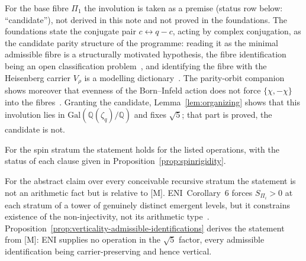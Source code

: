 \documentclass[11pt]{article}
\theoremstyle{definition}
\theoremstyle{remark}
\newcommand{\Gal}{\mathrm{Gal}}
\begin{document}
        For the base fibre $\Pi_1$ the involution is taken as a premise (status row below: ``candidate''), not derived in
    this note and not proved in the foundations.
    The foundations state the conjugate pair $c\leftrightarrow q-c$, acting by complex conjugation, as the candidate
    parity structure of the programme: reading it as the minimal admissible fibre is a structurally motivated
    hypothesis, the fibre identification being an open classification problem~\cite{Beau2026m}, and identifying the
    fibre with the Heisenberg carrier $V_\rho$ is a modelling dictionary~\cite{Beau2026m,Beau2026HeisenbergStructure}.
    The parity-orbit companion shows moreover that evenness of the Born--Infeld action does not force
    $\{\chi,-\chi\}$ into the fibres~\cite{Beau2026a22}.
    Granting the candidate, Lemma~\ref{lem:organizing} shows that this involution lies in
    $\Gal(\mathbb{Q}(\zeta_q)/\mathbb{Q})$ and fixes $\sqrt{5}$; that part is proved, the candidate is not.

    For the spin stratum the statement holds for the listed operations, with the status of each clause given in
    Proposition~\ref{prop:spinrigidity}.

    For the abstract claim over every conceivable recursive stratum the statement is not an arithmetic fact but is
    relative to [M].
    ENI~Corollary~6 forces $S_{\Pi_i}>0$ at each stratum of a tower of genuinely distinct emergent levels, but it
    constrains existence of the non-injectivity, not its arithmetic type~\cite{Beau2026l,Beau2026ninote}.
    Proposition~\ref{prop:verticality-admissible-identifications} derives the statement from [M]: ENI supplies no
    operation in the $\sqrt{5}$ factor, every admissible identification being carrier-preserving and hence vertical.
\end{document}
